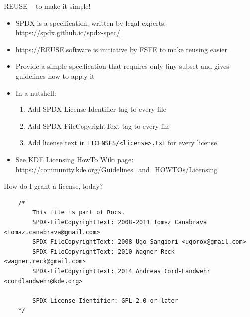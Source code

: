 \documentclass[t,compress,aspectratio=169]{beamer}
\begin{document}
\begin{frame}
    {REUSE -- to make it simple!}

    \begin{itemize}
        \item SPDX is a specification, written by legal experts:\\
            \url{https://spdx.github.io/spdx-spec/}
        \item \url{https://REUSE.software} is initiative by FSFE to make reusing easier
        \item Provide a simple specification that requires only tiny subset and gives guidelines how to apply it
        \item In a nutshell:
            \begin{enumerate}
                \item Add SPDX-License-Identifier tag to every file
                \item Add SPDX-FileCopyrightText tag to every file
                \item Add license text in \texttt{LICENSES/<license>.txt} for every license
            \end{enumerate}
        \item See KDE Licensing HowTo Wiki page: \url{https://community.kde.org/Guidelines_and_HOWTOs/Licensing}
    \end{itemize}
\end{frame}

\begin{frame}[fragile]
    {How do I grant a license, today?}

    \begin{example}
    \tiny
    \begin{verbatim}
    /*
        This file is part of Rocs.
        SPDX-FileCopyrightText: 2008-2011 Tomaz Canabrava <tomaz.canabrava@gmail.com>
        SPDX-FileCopyrightText: 2008 Ugo Sangiori <ugorox@gmail.com>
        SPDX-FileCopyrightText: 2010 Wagner Reck <wagner.reck@gmail.com>
        SPDX-FileCopyrightText: 2014 Andreas Cord-Landwehr <cordlandwehr@kde.org>

        SPDX-License-Identifier: GPL-2.0-or-later
    */
    \end{verbatim}
    \end{example}
\end{frame}
\end{document}
